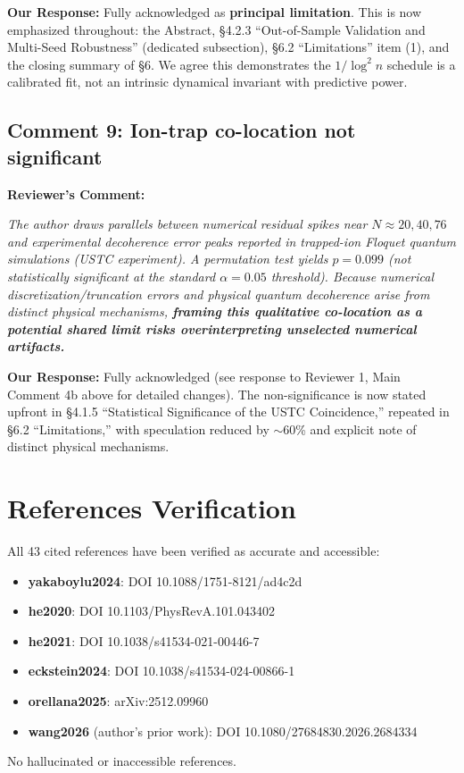 \documentclass[11pt]{article}
\begin{document}
\noindent\textbf{Our Response:} Fully acknowledged as \textbf{principal limitation}. This is now emphasized throughout: the Abstract, \S4.2.3 ``Out-of-Sample Validation and Multi-Seed Robustness'' (dedicated subsection), \S6.2 ``Limitations'' item (1), and the closing summary of \S6. We agree this demonstrates the $1/\log^2n$ schedule is a calibrated fit, not an intrinsic dynamical invariant with predictive power.

\subsection*{Comment 9: Ion-trap co-location not significant}

\noindent\textbf{Reviewer's Comment:}
\begin{quotebox}
\itshape The author draws parallels between numerical residual spikes near $N \approx 20, 40, 76$ and experimental decoherence error peaks reported in trapped-ion Floquet quantum simulations (USTC experiment). A permutation test yields $p = 0.099$ (not statistically significant at the standard $\alpha = 0.05$ threshold). Because numerical discretization/truncation errors and physical quantum decoherence arise from distinct physical mechanisms, \textbf{framing this qualitative co-location as a potential shared limit risks overinterpreting unselected numerical artifacts.}
\end{quotebox}

\noindent\textbf{Our Response:} Fully acknowledged (see response to Reviewer 1, Main Comment 4b above for detailed changes). The non-significance is now stated upfront in \S4.1.5 ``Statistical Significance of the USTC Coincidence,'' repeated in \S6.2 ``Limitations,'' with speculation reduced by $\sim$60\% and explicit note of distinct physical mechanisms.

\section*{References Verification}

All 43 cited references have been verified as accurate and accessible:
\begin{itemize}
\item \textbf{yakaboylu2024}: DOI 10.1088/1751-8121/ad4c2d
\item \textbf{he2020}: DOI 10.1103/PhysRevA.101.043402
\item \textbf{he2021}: DOI 10.1038/s41534-021-00446-7
\item \textbf{eckstein2024}: DOI 10.1038/s41534-024-00866-1
\item \textbf{orellana2025}: arXiv:2512.09960
\item \textbf{wang2026} (author's prior work): DOI 10.1080/27684830.2026.2684334
\end{itemize}
No hallucinated or inaccessible references.
\end{document}
